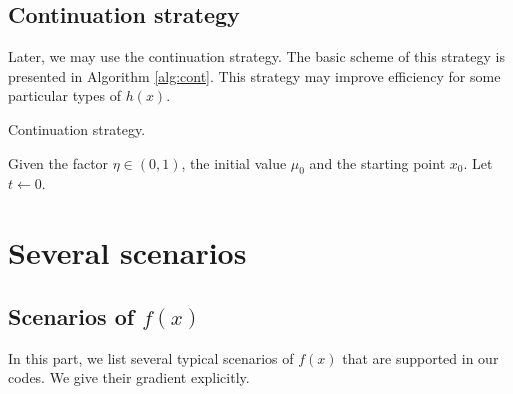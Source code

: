 \documentclass[a4paper]{article}
\begin{document}
  \subsection{Continuation strategy}
  Later, we may use the continuation strategy.
  The basic scheme of this strategy is presented in Algorithm 
  \ref{alg:cont}. This strategy may improve efficiency for some 
  particular types of $h(x)$.
  \begin{algorithm}[h]
    \caption{Continuation strategy.}
    \label{alg:cont}
    \LinesNumbered
    Given the factor $\eta \in (0,1)$, the initial value $\mu_0$ and 
    the starting point $x_0$. Let $t \leftarrow 0$.\\
  \end{algorithm}
  
  
  
  
  
  \section{Several scenarios}
  \label{sec:cal}
  
  \subsection{Scenarios of $f(x)$}
  \label{sec:cal_f}
  In this part, we list several typical scenarios of $f(x)$ that are 
  supported in our codes. We give their gradient explicitly.
  
\end{document}
